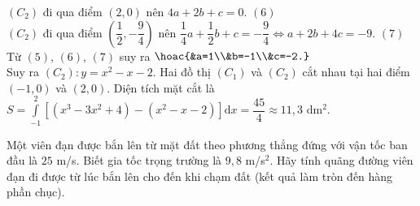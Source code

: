 \begin{ex}
{			$(C_2)$ đi qua điểm $(2,0)$ nên $4a+2b+c=0$. \hfill{$(6)$}\\
			$(C_2)$ đi qua điểm $\left(\dfrac{1}{2},-\dfrac{9}{4}\right)$ nên $\dfrac{1}{4}a+\dfrac{1}{2}b+c=-\dfrac{9}{4} \Leftrightarrow a + 2b +4c = -9$. \hfill{$(7)$}\\
			Từ $(5)$, $(6)$, $(7)$ suy ra $\hoac{&a=1\\&b=-1\\&c=-2.}$\\
			Suy ra $(C_2) \colon y= x^2 - x - 2$.
			Hai đồ thị $(C_1)$ và $(C_2)$ cắt nhau tại hai điểm $(-1,0)$ và $(2,0)$.
			Diện tích mặt cắt là\\
			$S = \displaystyle \int\limits_{-1}^{2} \left[\left(x^3 - 3x^2 +4\right) - \left(x^2 - x - 2\right)\right] \mathrm{d}x = \dfrac{45}{4} \approx 11{,}3$ dm$^2$.
	}
\end{ex}

\begin{ex}%
	Một viên đạn được bắn lên từ mặt đất theo phương thẳng đứng với vận tốc ban đầu là $25$ m/s. Biết gia tốc trọng trường là $9{,}8$ m/s$^2$. Hãy tính quãng đường viên đạn đi được từ lúc bắn lên cho đến khi chạm đất (kết quả làm tròn đến hàng phần chục).
\end{ex}

